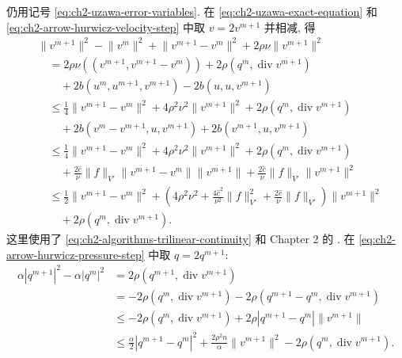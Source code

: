 \begin{Proof}
仍用记号 \eqref{eq:ch2-uzawa-error-variables}. 在 \eqref{eq:ch2-uzawa-exact-equation} 和 \eqref{eq:ch2-arrow-hurwicz-velocity-step} 中取 $v=2v^{m+1}$ 并相减, 得
\begin{equation}
\begin{aligned}
&\lVert v^{m+1}\rVert^2-\lVert v^m\rVert^2
+\lVert v^{m+1}-v^m\rVert^2+2\rho\nu\lVert v^{m+1}\rVert^2\\
&\quad=2\rho\nu((v^{m+1},v^{m+1}-v^m))
+2\rho(q^m,\operatorname{div}v^{m+1})\\
&\qquad+2b(u^m,u^{m+1},v^{m+1})-2b(u,u,v^{m+1})\\
&\quad\leq\frac14\lVert v^{m+1}-v^m\rVert^2
+4\rho^2\nu^2\lVert v^{m+1}\rVert^2
+2\rho(q^m,\operatorname{div}v^{m+1})\\
&\qquad+2b(v^m-v^{m+1},u,v^{m+1})
+2b(v^{m+1},u,v^{m+1})\\
&\quad\leq\frac14\lVert v^{m+1}-v^m\rVert^2
+4\rho^2\nu^2\lVert v^{m+1}\rVert^2
+2\rho(q^m,\operatorname{div}v^{m+1})\\
&\qquad+\frac{2\widehat c}\nu\lVert f\rVert_{V'}
\lVert v^{m+1}-v^m\rVert\lVert v^{m+1}\rVert
+\frac{2\widehat c}\nu\lVert f\rVert_{V'}\lVert v^{m+1}\rVert^2\\
&\quad\leq\frac12\lVert v^{m+1}-v^m\rVert^2
+\left(4\rho^2\nu^2+\frac{4\widehat c^2}{\nu^2}\lVert f\rVert_{V'}^2
+\frac{2\widehat c}\nu\lVert f\rVert_{V'}\right)\lVert v^{m+1}\rVert^2\\
&\qquad+2\rho(q^m,\operatorname{div}v^{m+1}).
\end{aligned}
\label{eq:ch2-arrow-hurwicz-velocity-energy}
\end{equation}
这里使用了 \eqref{eq:ch2-algorithms-trilinear-continuity} 和 Chapter 2 的 . 在 \eqref{eq:ch2-arrow-hurwicz-pressure-step} 中取 $q=2q^{m+1}$:
\begin{equation}
\begin{aligned}
\alpha|q^{m+1}|^2-\alpha|q^m|^2
&=2\rho(q^{m+1},\operatorname{div}v^{m+1})\\
&=-2\rho(q^m,\operatorname{div}v^{m+1})
-2\rho(q^{m+1}-q^m,\operatorname{div}v^{m+1})\\
&\leq-2\rho(q^m,\operatorname{div}v^{m+1})
+2\rho|q^{m+1}-q^m|\lVert v^{m+1}\rVert\\
&\leq\frac\alpha2|q^{m+1}-q^m|^2
+\frac{2\rho^2n}{\alpha}\lVert v^{m+1}\rVert^2
-2\rho(q^m,\operatorname{div}v^{m+1}).
\end{aligned}
\label{eq:ch2-arrow-hurwicz-pressure-energy}

\end{equation}
\end{Proof}
